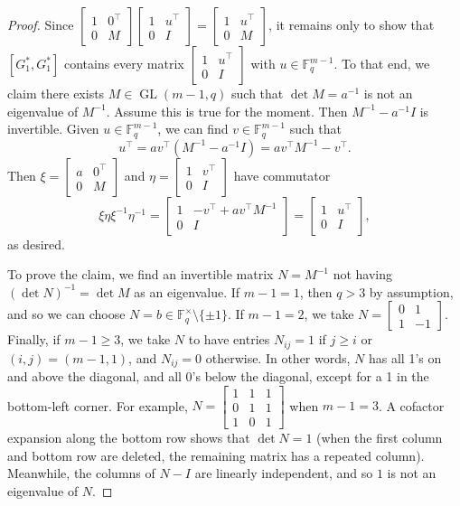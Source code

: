 \begin{proof}
Since $\begin{bmatrix} 1 & 0^\top \\ 0 & M \end{bmatrix} \begin{bmatrix} 1 & u^\top \\ 0 & I \end{bmatrix} = \begin{bmatrix} 1 & u^\top \\ 0 & M \end{bmatrix}$, it remains only to show that $[G_1^*,G_1^*]$ contains every matrix $\begin{bmatrix} 1 & u^\top \\ 0 & I \end{bmatrix}$ with $u \in \mathbb{F}_q^{m-1}$.
To that end, we claim there exists $M \in \operatorname{GL}(m-1,q)$ such that $\det M = a^{-1}$ is not an eigenvalue of $M^{-1}$.
Assume this is true for the moment.
Then $M^{-1} - a^{-1} I$ is invertible.
Given $u \in \mathbb{F}_q^{m-1}$, we can find $v \in \mathbb{F}_q^{m-1}$ such that 
\[ u^\top = av^\top(M^{-1} - a^{-1} I) = av^\top M^{-1} - v^\top. \]
Then $\xi = \begin{bmatrix} a & 0^\top \\ 0  & M \end{bmatrix}$ and $\eta = \begin{bmatrix} 1 & v^\top \\ 0 & I \end{bmatrix}$ have commutator 
\[ \xi \eta \xi^{-1} \eta^{-1} = \begin{bmatrix} 1 & -v^\top + av^\top M^{-1} \\ 0 & I \end{bmatrix} = \begin{bmatrix} 1 & u^\top \\ 0 & I \end{bmatrix}, \]
as desired.

To prove the claim, we find an invertible matrix $N = M^{-1}$ not having $(\det N)^{-1} = \det M$ as an eigenvalue.
If $m-1 = 1$, then $q > 3$ by assumption, and so we can choose $N = b \in \mathbb{F}_q^\times \setminus \{ \pm 1\}$.
If $m-1 = 2$, we take $N = \begin{bmatrix} 0 & 1 \\ 1 & -1 \end{bmatrix}$.
Finally, if $m-1 \geq 3$, we take $N$ to have entries $N_{ij} = 1$ if $j \geq i$ or $(i,j) = (m-1,1)$, and $N_{ij} = 0$ otherwise.
In other words, $N$ has all 1's on and above the diagonal, and all 0's below the diagonal, except for a 1 in the bottom-left corner.
For example, $N = \begin{bmatrix} 1 & 1 & 1 \\ 0 & 1 & 1 \\ 1 & 0 & 1 \end{bmatrix}$ when $m-1=3$.
A cofactor expansion along the bottom row shows that $\det N = 1$ (when the first column and bottom row are deleted, the remaining matrix has a repeated column).
Meanwhile, the columns of $N-I$ are linearly independent, and so $1$ is not an eigenvalue of $N$.
\end{proof}



